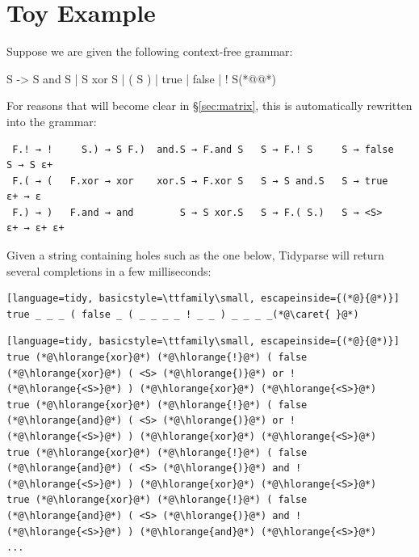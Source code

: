 \documentclass[sigplan,review,anonymous,acmsmall]{acmart}\settopmatter{printfolios=false,printccs=false,printacmref=false}
\begin{document}
%

\section{Toy Example}

Suppose we are given the following context-free grammar:

\begin{tidyinput}
S -> S and S | S xor S | ( S ) | true | false | ! S(*@\caret{ }@*)
\end{tidyinput}

\noindent For reasons that will become clear in \S\ref{sec:matrix}, this is automatically rewritten into the grammar:

\begin{verbatim}
 F.! → !     S.) → S F.)  and.S → F.and S   S → F.! S     S → false    S → S ε+
 F.( → (   F.xor → xor    xor.S → F.xor S   S → S and.S   S → true    ε+ → ε
 F.) → )   F.and → and        S → S xor.S   S → F.( S.)   S → <S>     ε+ → ε+ ε+
\end{verbatim}

%

\noindent Given a string containing holes such as the one below, Tidyparse will return several completions in a few milliseconds:

\begin{tcolorbox}
  \begin{lstlisting}[language=tidy, basicstyle=\ttfamily\small, escapeinside={(*@}{@*)}]
true _ _ _ ( false _ ( _ _ _ _ ! _ _ ) _ _ _ _(*@\caret{ }@*)
  \end{lstlisting}
  \tcblower
  \begin{lstlisting}[language=tidy, basicstyle=\ttfamily\small, escapeinside={(*@}{@*)}]
true (*@\hlorange{xor}@*) (*@\hlorange{!}@*) ( false (*@\hlorange{xor}@*) ( <S> (*@\hlorange{)}@*) or ! (*@\hlorange{<S>}@*) ) (*@\hlorange{xor}@*) (*@\hlorange{<S>}@*)
true (*@\hlorange{xor}@*) (*@\hlorange{!}@*) ( false (*@\hlorange{and}@*) ( <S> (*@\hlorange{)}@*) or ! (*@\hlorange{<S>}@*) ) (*@\hlorange{xor}@*) (*@\hlorange{<S>}@*)
true (*@\hlorange{xor}@*) (*@\hlorange{!}@*) ( false (*@\hlorange{and}@*) ( <S> (*@\hlorange{)}@*) and ! (*@\hlorange{<S>}@*) ) (*@\hlorange{xor}@*) (*@\hlorange{<S>}@*)
true (*@\hlorange{xor}@*) (*@\hlorange{!}@*) ( false (*@\hlorange{and}@*) ( <S> (*@\hlorange{)}@*) and ! (*@\hlorange{<S>}@*) ) (*@\hlorange{and}@*) (*@\hlorange{<S>}@*)
...
  \end{lstlisting}
\end{tcolorbox}
\end{document}
